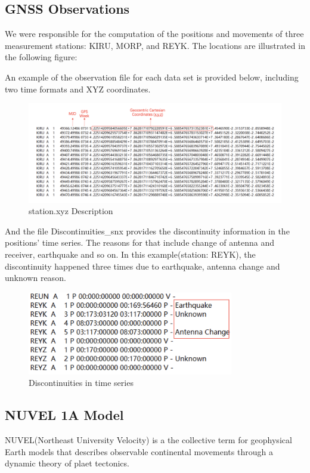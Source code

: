 \documentclass{article}
\begin{document}
\subsection{GNSS Observations}
We were responsible for the computation of the positions and movements of three measurement stations: KIRU, MORP, and REYK. The locations are illustrated in the following figure:

An example of the observation file for each data set is provided below, including two time formats and XYZ coordinates.
\begin{figure}[H]
    \centering
    \includegraphics[width=12cm]{./source/xyz.png}
    \caption{station.xyz Description}
    \label{fig:XYZ_obs}
\end{figure}

And the file Discontinuities\_snx provides the discontinuity information in the positions' time series. The reasons for that include change of antenna and receiver, earthquake and so on.
In this example(station: REYK), the discontinuity happened three times due to earthquake, antenna change and unknown reason.
\begin{figure}[H]
  \centering
  \includegraphics[width=9cm]{../source/dis.png}
  \caption{Discontinuities in time series}
  \label{fig:Dis_snx}
\end{figure}

\subsection{NUVEL 1A Model}
NUVEL(Northeast University Velocity) is a the collective term for geophysical Earth models that describes observable
continental movements through a dynamic theory of plaet tectonics.
\end{document}
